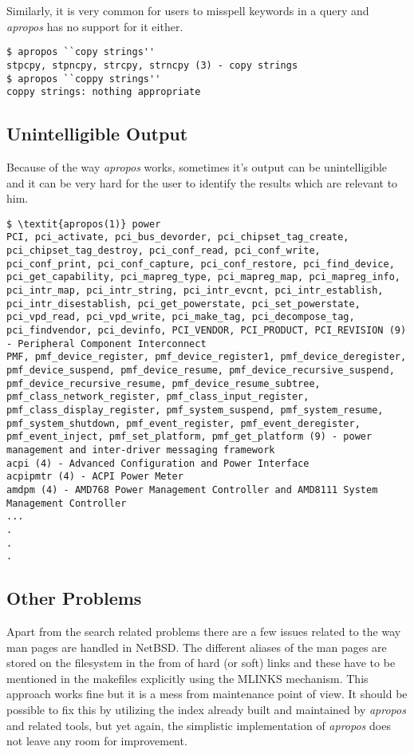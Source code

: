 \documentclass[titlepage, a4paper, 12pt]{article}
\begin{document}
Similarly, it is very common for users to misspell keywords in a query and \textit{apropos} has no support for it either.
\begin{lstlisting}
$ apropos ``copy strings''
stpcpy, stpncpy, strcpy, strncpy (3) - copy strings
$ apropos ``coppy strings''
coppy strings: nothing appropriate
\end{lstlisting}

\subsection{Unintelligible Output}
Because of the way \textit{apropos} works, sometimes it's output can be
unintelligible and it can be very hard for the user to identify the results which
are relevant to him.
\begin{lstlisting}
$ \textit{apropos(1)} power
PCI, pci_activate, pci_bus_devorder, pci_chipset_tag_create,
pci_chipset_tag_destroy, pci_conf_read, pci_conf_write,
pci_conf_print, pci_conf_capture, pci_conf_restore, pci_find_device,
pci_get_capability, pci_mapreg_type, pci_mapreg_map, pci_mapreg_info,
pci_intr_map, pci_intr_string, pci_intr_evcnt, pci_intr_establish,
pci_intr_disestablish, pci_get_powerstate, pci_set_powerstate,
pci_vpd_read, pci_vpd_write, pci_make_tag, pci_decompose_tag,
pci_findvendor, pci_devinfo, PCI_VENDOR, PCI_PRODUCT, PCI_REVISION (9)
- Peripheral Component Interconnect
PMF, pmf_device_register, pmf_device_register1, pmf_device_deregister,
pmf_device_suspend, pmf_device_resume, pmf_device_recursive_suspend,
pmf_device_recursive_resume, pmf_device_resume_subtree,
pmf_class_network_register, pmf_class_input_register,
pmf_class_display_register, pmf_system_suspend, pmf_system_resume,
pmf_system_shutdown, pmf_event_register, pmf_event_deregister,
pmf_event_inject, pmf_set_platform, pmf_get_platform (9) - power
management and inter-driver messaging framework
acpi (4) - Advanced Configuration and Power Interface
acpipmtr (4) - ACPI Power Meter
amdpm (4) - AMD768 Power Management Controller and AMD8111 System
Management Controller
...
.
.
.
\end{lstlisting}
\subsection{Other Problems}
Apart from the search related problems there are a few issues related to
the way man pages are handled in NetBSD. The different aliases of the man pages
are stored on the filesystem in the from of hard (or soft) links and these
have to be mentioned in the makefiles explicitly using the MLINKS mechanism. This
approach works fine but it is a mess from maintenance point of view.
It should be possible to fix this by utilizing the index already built and
maintained by \textit{apropos} and related tools, but yet again, the
simplistic implementation of \textit{apropos} does not leave any room for
improvement.
\end{document}
